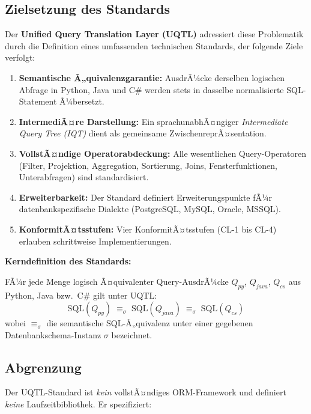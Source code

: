 \subsection{Zielsetzung des Standards}
\label{subsec:ziel}

Der \textbf{Unified Query Translation Layer (UQTL)} adressiert diese Problematik
durch die Definition eines umfassenden technischen Standards, der folgende
Ziele verfolgt:

\begin{enumerate}[leftmargin=1.5cm]
  \item \textbf{Semantische Ã„quivalenzgarantie:} AusdrÃ¼cke derselben logischen
    Abfrage in Python, Java und C\# werden stets in dasselbe normalisierte
    SQL-Statement Ã¼bersetzt.
  \item \textbf{IntermediÃ¤re Darstellung:} Ein sprachunabhÃ¤ngiger
    \emph{Intermediate Query Tree (IQT)} dient als gemeinsame ZwischenreprÃ¤sentation.
  \item \textbf{VollstÃ¤ndige Operatorabdeckung:} Alle wesentlichen
    Query-Operatoren (Filter, Projektion, Aggregation, Sortierung, Joins,
    Fensterfunktionen, Unterabfragen) sind standardisiert.
  \item \textbf{Erweiterbarkeit:} Der Standard definiert Erweiterungspunkte
    fÃ¼r datenbankspezifische Dialekte (PostgreSQL, MySQL, Oracle, MSSQL).
  \item \textbf{KonformitÃ¤tsstufen:} Vier KonformitÃ¤tsstufen (CL-1 bis CL-4)
    erlauben schrittweise Implementierungen.
\end{enumerate}

\begin{infobox}
\textbf{Kerndefinition des Standards:}

FÃ¼r jede Menge logisch Ã¤quivalenter Query-AusdrÃ¼cke $Q_{py}$, $Q_{java}$,
$Q_{cs}$ aus Python, Java bzw.\ C\# gilt unter UQTL:
\[
  \mathrm{SQL}(Q_{py}) \;\equiv_\sigma\; \mathrm{SQL}(Q_{java})
  \;\equiv_\sigma\; \mathrm{SQL}(Q_{cs})
\]
wobei $\equiv_\sigma$ die semantische SQL-Ã„quivalenz unter einer gegebenen
Datenbankschema-Instanz $\sigma$ bezeichnet.
\end{infobox}

\subsection{Abgrenzung}
\label{subsec:abgrenzung}

Der UQTL-Standard ist \emph{kein} vollstÃ¤ndiges ORM-Framework und definiert
\emph{keine} Laufzeitbibliothek. Er spezifiziert:

